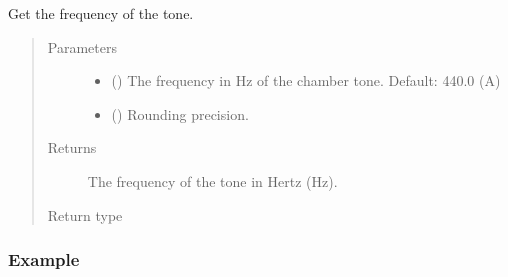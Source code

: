 \documentclass[letterpaper,10pt,english]{sphinxmanual}
\begin{document}
\begin{fulllineitems}
\begin{fulllineitems}
\label{\detokenize{api:musictheory.Tone.get_frequency}}
Get the frequency of the tone.
\begin{quote}\begin{description}
\item[{Parameters}] \leavevmode\begin{itemize}
\item {} 
 () \textendash{} The frequency in Hz of the chamber tone. Default: 440.0 (A)

\item {} 
 () \textendash{} Rounding precision.

\end{itemize}

\item[{Returns}] \leavevmode
The frequency of the tone in Hertz (Hz).

\item[{Return type}] \leavevmode
{}

\end{description}\end{quote}
\subsubsection*{Example}

\begin{sphinxVerbatim}[commandchars=\\\{\}]
  
\end{sphinxVerbatim}

\end{fulllineitems}


\end{fulllineitems}
\end{document}
